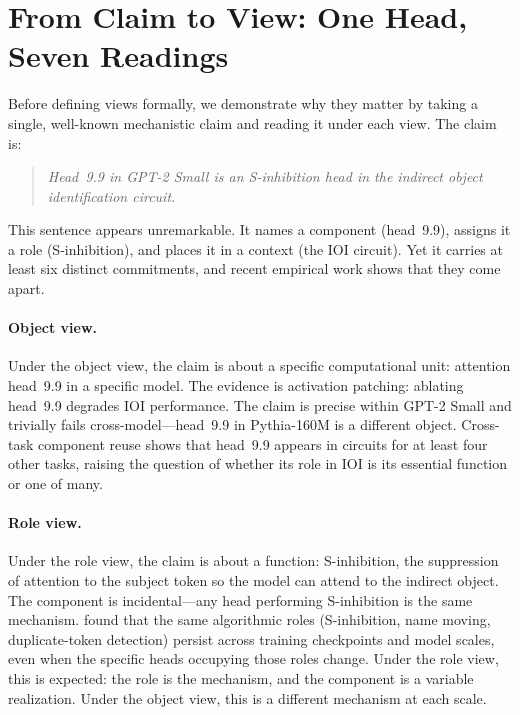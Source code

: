 \documentclass{article}
\begin{document}
\section{From Claim to View: One Head, Seven Readings}\label{sec:motivation}

Before defining views formally, we demonstrate why they matter by
taking a single, well-known mechanistic claim and reading it under
each view.  The claim is:

\begin{quote}
\emph{Head~9.9 in GPT-2 Small is an S-inhibition head in the
indirect object identification circuit.}
\end{quote}

This sentence appears unremarkable.  It names a component (head~9.9),
assigns it a role (S-inhibition), and places it in a context (the IOI
circuit).  Yet it carries at least six distinct commitments, and recent
empirical work shows that they come apart.

\paragraph{Object view.}
Under the object view, the claim is about a specific computational unit:
attention head~9.9 in a specific model.  The evidence is activation
patching: ablating head~9.9 degrades IOI performance.  The claim is
precise within GPT-2 Small and trivially fails cross-model---head~9.9
in Pythia-160M is a different object.  Cross-task component reuse
\citep{merullo2024} shows that head~9.9 appears in circuits for at
least four other tasks, raising the question of whether its role in IOI
is its essential function or one of many.

\paragraph{Role view.}
Under the role view, the claim is about a function: S-inhibition,
the suppression of attention to the subject token so the model can
attend to the indirect object.  The component is incidental---any head
performing S-inhibition is the same mechanism.
\citet{tigges2024} found that the same algorithmic roles
(S-inhibition, name moving, duplicate-token detection) persist across
training checkpoints and model scales, even when the specific heads
occupying those roles change.  Under the role view, this is expected:
the role is the mechanism, and the component is a variable realization.
Under the object view, this is a different mechanism at each scale.
\end{document}
